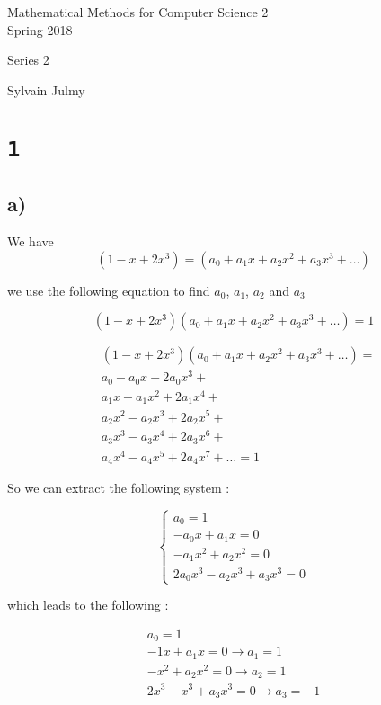 \documentclass[a4paper,11pt]{report}
\author{Sylvain Julmy}
\date{\today}
\begin{document}
\begin{center}
  \Large{
    Mathematical Methods for Computer Science 2\\
    Spring 2018
  }
  \noindent\makebox[\linewidth]{\rule{\linewidth}{0.4pt}}

  Series 2
  \vspace*{1.4cm}

  Sylvain Julmy
  
  \noindent\makebox[\linewidth]{\rule{\linewidth}{0.4pt}}
\end{center}

\section*{\texttt{1}}

\subsection*{a)}

We have
\[
  (1-x + 2x^3) = (a_0 + a_1 x + a_2 x^2 + a_3 x^3 + \dots)
\]

we use the following equation to find $a_0$, $a_1$, $a_2$ and $a_3$

\[
  (1-x+2x^3)(a_0 + a_1 x + a_2 x^2 + a_3 x^3 + \dots) = 1
\]

\begin{align*}
  & (1-x+2x^3)(a_0 + a_1 x + a_2 x^2 + a_3 x^3 + \dots) = \\
  & a_0 - a_0 x + 2 a_0 x^3 + \\
  & a_1 x - a_1 x^2 + 2 a_1 x^4 + \\
  & a_2 x^2 - a_2 x^3 + 2 a_2 x^5 + \\
  & a_3 x^3 - a_3 x^4 + 2 a_3 x^6 + \\
  & a_4 x^4 - a_4 x^5 + 2 a_4 x^7 + \dots = 1
\end{align*}

So we can extract the following system :

\[
  \begin{cases}
    a_0 = 1 \\
    -a_0 x + a_1 x = 0 \\
    -a_1 x^2 + a_2 x^2 = 0 \\
    2 a_0 x^3 - a_2 x^3 + a_3 x^3 = 0
  \end{cases}
\]

which leads to the following :

\begin{gather*}
  a_0 = 1 \\
  -1 x + a_1 x = 0 \longrightarrow a_1 = 1 \\
  -x^2 + a_2 x^2 = 0 \longrightarrow a_2 = 1 \\
  2x^3 - x^3 + a_3 x^3 = 0 \longrightarrow a_3 = -1
\end{gather*}
\end{document}
